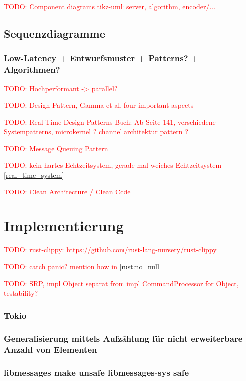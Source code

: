 \documentclass[
	12pt,
	table,
	bigheadings,
	ngerman,
	a4paper,
	BCOR5mm,
	DIV14,
	1.1headlines,
	pagesize,
	oneside,
	openright,
	titlepage,
	headsepline,
	nochapterprefix,
	bibtotoc,
	tocindent,
	listsindent,
	pointlessnumbers,
	cleardoubleempty,
	fleqn,
	halfparskip
]{scrbook}
\newcommand{\todo}[1]{\textcolor{red}{TODO: #1}}
\begin{document}
		\todo{Component diagrams tikz-uml: server, algorithm, encoder/...}		
		
		\section{Sequenzdiagramme}
		
		\subsection{Low-Latency + Entwurfsmuster + Patterns? + Algorithmen?}
		\todo{Hochperformant -> parallel?}
		
		\todo{Design Pattern, Gamma et al, four important aspects}
		
		\todo{Real Time Design Patterns Buch: Ab Seite 141, verschiedene Systempatterns, microkernel \cite[151]{douglass2003real}? channel architektur pattern \cite[167]{douglass2003real}?}
		
		\todo{Message Queuing Pattern \cite[207]{douglass2003real}}
		
		\todo{kein hartes Echtzeitsystem, gerade mal weiches Echtzeitsystem \autoref{real_time_system}}
		
		\todo{Clean Architecture / Clean Code}
	
	\chapter{Implementierung}
	
	\todo{rust-clippy: https://github.com/rust-lang-nursery/rust-clippy}
	
	\todo{catch panic? mention how in \autoref{rust:no_null}}
	
	\todo{SRP, impl Object separat from impl CommandProcessor for Object, testability?}
	
	\subsection{Tokio}
	
		\subsection{Generalisierung mittels Aufzählung für nicht erweiterbare Anzahl von Elementen}
		
		\subsection{libmessages make unsafe libmessages-sys safe}
		
\end{document}

